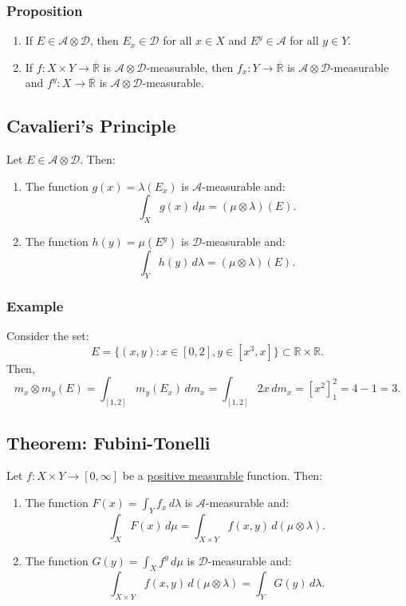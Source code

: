 \documentclass[11pt]{article}
\begin{document}
\subsubsection{Proposition}
\begin{enumerate}
    \item If \(E \in \mathcal{A} \otimes \mathcal{D}\), then \(E_x \in \mathcal{D}\) for all \(x \in X\) and \(E^y \in \mathcal{A}\) for all \(y \in Y\).
    \item If \(f: X \times Y \to \overline{\mathbb{R}}\) is \(\mathcal{A} \otimes \mathcal{D}\)-measurable, then \(f_x: Y \to \overline{\mathbb{R}}\) is \(\mathcal{A} \otimes \mathcal{D}\)-measurable and \(f^y: X \to \overline{\mathbb{R}}\) is \(\mathcal{A} \otimes \mathcal{D}\)-measurable.
\end{enumerate}

\subsection{Cavalieri's Principle}
Let \(E \in \mathcal{A} \otimes \mathcal{D}\). Then:
\begin{enumerate}
    \item The function \(g(x) = \lambda(E_x)\) is \(\mathcal{A}\)-measurable and:
        \[\int_X g(x) \,d\mu = (\mu \otimes \lambda)(E).\]
    \item The function \(h(y) = \mu(E^y)\) is \(\mathcal{D}\)-measurable and:
        \[\int_Y h(y) \,d\lambda = (\mu \otimes \lambda)(E).\]
\end{enumerate}

\subsubsection*{Example}
Consider the set:
\[E = \{(x, y) : x \in [0, 2], y \in [x^3, x] \} \subset \mathbb{R} \times \mathbb{R}.\]
Then, 
\[m_x \otimes m_y (E) = \int_{[1, 2]} m_y(E_x) \,dm_x = \int_{[1, 2]} 2x \,dm_x = \left[x^2\right]_{1}^{2} = 4 - 1 = 3.\]

\subsection{Theorem: Fubini-Tonelli}
Let \(f: X \times Y \to [0, \infty]\) be a \underline{positive measurable} function. Then:
\begin{enumerate}
    \item The function \(F(x) = \int_Y f_x \,d\lambda\) is \(\mathcal{A}\)-measurable and:
        \[\int_{X} F(x) \,d\mu = \int_{X \times Y} f(x, y) \,d(\mu \otimes \lambda).\]
    \item The function \(G(y) = \int_X f^y \,d\mu\) is \(\mathcal{D}\)-measurable and:
        \[\int_{X \times Y} f(x, y) \,d(\mu \otimes \lambda) = \int_Y G(y) \,d\lambda.\]
\end{enumerate}
\end{document}
